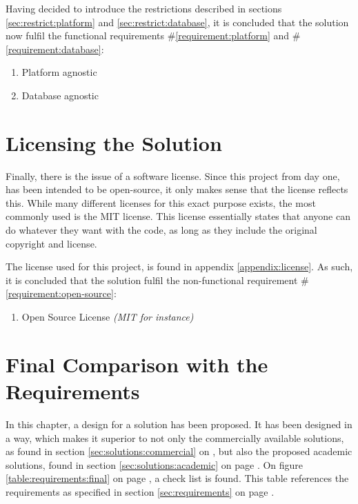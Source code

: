 			Having decided to introduce the restrictions described in sections \ref{sec:restrict:platform} and \ref{sec:restrict:database}, it is concluded that the solution now fulfil the functional requirements \#\ref{requirement:platform} and \#\ref{requirement:database}:
			\vspace{-3ex}\begin{enumerate}
				\setlength\itemsep{0.1em}
				\setcounter{enumi}{7-1}
				\item Platform agnostic
				\item Database agnostic
			\end{enumerate}

	\section{Licensing the Solution}
		\label{requirement:fulfilled:open-source}
		Finally, there is the issue of a software license. Since this project from day one, has been intended to be open-source, it only makes sense that the license reflects this. While many different licenses for this exact purpose exists, the most commonly used is the MIT license. This license essentially states that anyone can do whatever they want with the code, as long as they include the original copyright and license.

		The license used for this project, is found in appendix \ref{appendix:license}. As such, it is concluded that the solution fulfil the non-functional requirement \#\ref{requirement:open-source}:
		\vspace{-3ex}\begin{enumerate}
			\setlength\itemsep{0.1em}
			\setcounter{enumi}{2-1}
			\item Open Source License \emph{(MIT for instance)}
		\end{enumerate}


	\section{Final Comparison with the Requirements}
		In this chapter, a design for a solution has been proposed. It has been designed in a way, which makes it superior to not only the commercially available solutions, as found in section \ref{sec:solutions:commercial} on \pageref{sec:solutions:commercial}, but also the proposed academic solutions, found in section \ref{sec:solutions:academic} on page \pageref{sec:solutions:academic}. On figure \ref{table:requirements:final} on page \pageref{table:requirements:final}, a check list is found. This table references the requirements as specified in section \ref{sec:requirements} on page \pageref{sec:requirements}.

